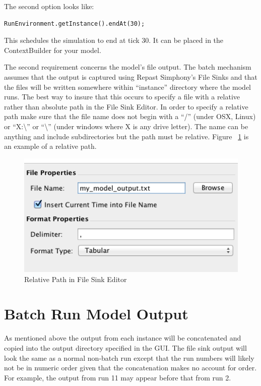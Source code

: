 \documentclass[11pt]{amsart}
\begin{document}
The second option looks like:

\begin{verbatim}
RunEnvironment.getInstance().endAt(30);
\end{verbatim}
\noindent
This schedules the simulation to end at tick 30. It can be placed in the ContextBuilder for your model.

The second requirement concerns the model's file output. The batch mechanism assumes that the output is captured using Repast Simphony's File Sinks and that the files will be written somewhere within ``instance'' directory where the model runs. The best way to insure that this occurs to specify a file with a relative rather than absolute path in the File Sink Editor. In order to specify a relative path make sure that the file name does not begin with a ``/'' (under OSX, Linux) or ``X:\textbackslash'' or ``\textbackslash'' (under windows where X is any drive letter). The name can be anything and include subdirectories but the path must be relative. Figure ~\ref{fig:file_name} is an example of a relative path.

\begin{figure}[h]
\begin{center}
\vspace{.2in}
\centerline {
\includegraphics[width=6in]{images/file_name.png}
}
\caption{Relative Path in File Sink Editor}
\label{fig:file_name}
\end{center}
\end{figure}

\section{Batch Run Model Output}
As mentioned above the output from each instance will be concatenated and copied into the output directory specified in the GUI. The file sink output will look the same as a normal non-batch run except that the run numbers will likely not be in numeric order given that the concatenation makes no account for order. For example, the output from run 11 may appear before that from run 2.
\end{document}
